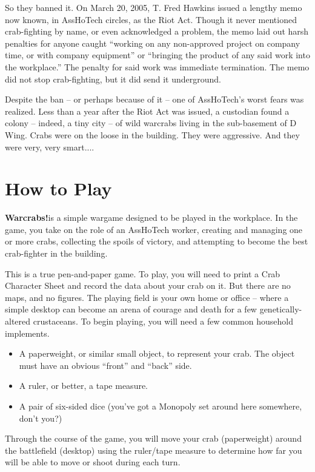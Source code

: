\documentclass[a4paper,10pt]{article}
\newcommand{\warcrabs}{\textbf{Warcrabs!}}
\begin{document}
So they banned it. On March 20, 2005, T. Fred Hawkins issued a lengthy memo now known, in AssHoTech circles, as the Riot Act. Though it never mentioned crab-fighting by name, or even acknowledged a problem, the memo laid out harsh penalties for anyone caught ``working on any non-approved project on company time, or with company equipment'' or ``bringing the product of any said work into the workplace.'' The penalty for said work was immediate termination. The memo did not stop crab-fighting, but it did send it underground.

Despite the ban -- or perhaps because of it -- one of AssHoTech's worst fears was realized. Less than a year after the Riot Act was issued, a custodian found a colony -- indeed, a tiny city -- of wild warcrabs living in the sub-basement of D Wing. Crabs were on the loose in the building. They were aggressive. And they were very, very smart....

\section*{How to Play}
\label{sec:HowtoPlay}

\warcrabs\hspace*{4pt}is a simple wargame designed to be played in the workplace. In the game, you take on the role of an AssHoTech worker, creating and managing one or more crabs, collecting the spoils of victory, and attempting to become the best crab-fighter in the building.

This is a true pen-and-paper game. To play, you will need to print a Crab Character Sheet and record the data about your crab on it. But there are no maps, and no figures. The playing field is your own home or office -- where a simple desktop can become an arena of courage and death for a few genetically-altered crustaceans. To begin playing, you will need a few common household implements.

\begin{itemize}
 \item A paperweight, or similar small object, to represent your crab. The object must have an obvious ``front'' and ``back'' side.
 \item A ruler, or better, a tape measure.
 \item A pair of six-sided dice (you've got a Monopoly set around here somewhere, don't you?)
\end{itemize}

Through the course of the game, you will move your crab (paperweight) around the battlefield (desktop) using the ruler/tape measure to determine how far you will be able to move or shoot during each turn.
\end{document}
